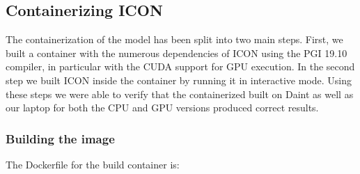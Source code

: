 \documentclass{article}
\begin{document}
\subsection{Containerizing ICON}
The containerization of the model has been split into two main steps. First, we built a container with the numerous dependencies of ICON using
the PGI 19.10 compiler, in particular with the CUDA support for GPU execution.
In the second step we built ICON inside the container by running it in interactive mode. 
Using these steps we were able to verify that the containerized built on Daint as well as our laptop for both the CPU and GPU versions produced correct results.

\subsubsection{Building the image}  

The Dockerfile for the build container is:
\end{document}
